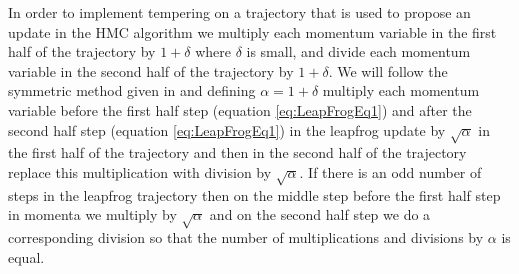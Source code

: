 \documentclass[12pt]{article}
\begin{document}
    In order to implement tempering on a trajectory that is used to propose an update in the HMC algorithm we multiply each momentum variable in the first half of the trajectory by $1+\delta$ where $\delta$ is small, and divide each momentum variable in the second half of the trajectory by $1+\delta$. We will follow the symmetric method given in \cite{neal_2011} and defining $\alpha=1+\delta$ multiply each momentum variable before the first half step (equation \ref{eq:LeapFrogEq1}) and after the second half step (equation \ref{eq:LeapFrogEq1}) in the leapfrog update by $\sqrt{\alpha}$ in the first half of the trajectory and then in the second half of the trajectory replace this multiplication with division by $\sqrt{\alpha}$. If there is an odd number of steps in the leapfrog trajectory then on the middle step before the first half step in momenta we multiply by $\sqrt{\alpha}$  and on the second half step we do a corresponding division so that the number of multiplications and divisions by $\alpha$ is equal.
\end{document}
